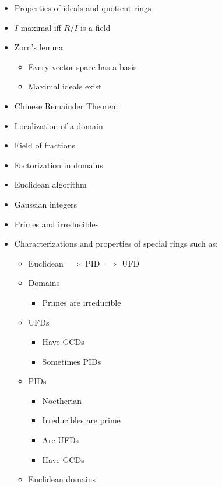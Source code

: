\begin{itemize}
\item
  Properties of ideals and quotient rings
\item
  \(I\) maximal iff \(R/I\) is a field
\item
  Zorn's lemma

  \begin{itemize}
  \tightlist
  \item
    Every vector space has a basis
  \item
    Maximal ideals exist
  \end{itemize}
\item
  Chinese Remainder Theorem
\item
  Localization of a domain
\item
  Field of fractions
\item
  Factorization in domains
\item
  Euclidean algorithm
\item
  Gaussian integers
\item
  Primes and irreducibles
\item
  Characterizations and properties of special rings such as:

  \begin{itemize}
  \tightlist
  \item
    Euclidean \(\implies\) PID \(\implies\) UFD
  \item
    Domains

    \begin{itemize}
    \tightlist
    \item
      Primes are irreducible
    \end{itemize}
  \item
    UFDs

    \begin{itemize}
    \tightlist
    \item
      Have GCDs
    \item
      Sometimes PIDs
    \end{itemize}
  \item
    PIDs

    \begin{itemize}
    \tightlist
    \item
      Noetherian
    \item
      Irreducibles are prime
    \item
      Are UFDs
    \item
      Have GCDs
    \end{itemize}
  \item
    Euclidean domains


\end{itemize}
\end{itemize}
